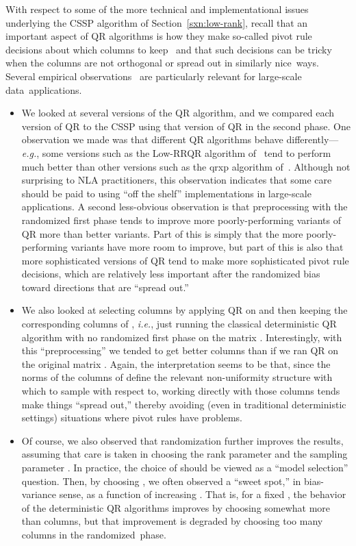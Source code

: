\documentclass[twoside]{article}
\begin{document}
With respect to some of the more technical and implementational issues
underlying the CSSP algorithm of Section~\ref{sxn:low-rank}, recall that an 
important aspect of QR algorithms is how they make so-called pivot rule 
decisions about which columns to keep~\cite{GVL96} and that such decisions 
can be tricky when the columns are not orthogonal or spread out in similarly 
nice~ways.
Several empirical observations~\cite{BMD08_CSSP_KDD,BMD08_CSSP_TRv2} are 
particularly relevant for large-scale data~applications.
\begin{itemize}
\item
We looked at several versions of the QR algorithm, and we compared each 
version of QR to the CSSP using that version of QR in the second phase.
One observation we made was that different QR algorithms behave 
differently---\emph{e.g.}, some versions such as the Low-RRQR algorithm 
of~\cite{CH94} tend to perform much better than other versions such as the 
qrxp algorithm of~\cite{BQ98a,BQ98b}.
Although not surprising to NLA practitioners, this observation indicates 
that some care should be paid to using ``off the shelf'' implementations in 
large-scale applications.
A second less-obvious observation is that preprocessing with the randomized 
first phase tends to improve more poorly-performing variants of QR more than 
better variants.
Part of this is simply that the more poorly-performing variants have more 
room to improve, but part of this is also that more sophisticated versions 
of QR tend to make more sophisticated pivot rule decisions, which are 
relatively less important after the randomized bias toward directions that 
are ``spread out.''
\item
We also looked at selecting columns by applying QR on  and then 
keeping the corresponding columns of , \emph{i.e.}, just running the 
classical deterministic QR algorithm with no randomized first phase on the 
matrix .
Interestingly, with this ``preprocessing'' we tended to get better columns 
than if we ran QR on the original matrix .
Again, the interpretation seems to be that, since the norms of the columns of 
 define the relevant non-uniformity structure with which to sample 
with respect to, working directly with those columns tends make things 
``spread out,'' thereby avoiding (even in traditional deterministic 
settings) situations where pivot rules have problems.
\item
Of course, we also observed that randomization further improves the results, 
assuming that care is taken in choosing the rank parameter  and the 
sampling parameter .
In practice, the choice of  should be viewed as a ``model selection'' 
question.
Then, by choosing , we often observed a 
``sweet spot,'' in bias-variance sense, as a function of increasing .
That is, for a fixed , the behavior of the deterministic QR algorithms 
improves by choosing somewhat more than  columns, but that improvement 
is degraded by choosing too many columns in the randomized~phase.
\end{itemize}
\end{document}
